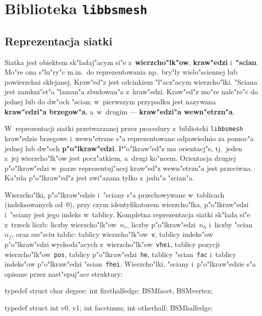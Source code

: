

\chapter{Biblioteka \texttt{libbsmesh}}

\section{Reprezentacja siatki}

Siatka jest obiektem sk"ladaj"acym si"e z~\textbf{wierzcho"lk"ow},
\textbf{kraw"edzi} i~\textbf{"scian}. Mo"re ona s"lu"ry"c m.in.\ do
reprezentowania np.\ bry"ly wielo"sciennej lub powierzchni sklejanej.
Kraw"ed"z jest odcinkiem "l"acz"acym wierzcho"lki.
"Sciana jest zamkni"et"a "laman"a zbudowan"a z~kraw"edzi. Kraw"ed"z mo"re
nale"re"c do jednej lub do dw"och "scian; w~pierwszym przypadku jest
nazywana \textbf{kraw"edzi"a brzegow"a}, a~w~drugim --- \textbf{kraw"edzi"a
wewn"etrzn"a}.

W~reprezentacji siatki przetwarzanej przez procedury z~biblioteki
\texttt{libbsmesh} kraw"edzie brzegowe i~wewn"etrzne s"a reprezentowane
odpowiednio za pomoc"a jednej lub dw"och \textbf{p"o"lkraw"edzi}.
P"o"lkraw"ed"z ma orientacj"e, tj.\ jeden z~jej wierzcho"lk"ow jest
pocz"atkiem, a~drugi ko"ncem. Orientacja drugiej p"o"lkraw"edzi w~parze
reprezentuj"acej kraw"ed"z wewn"etrzn"a jest przeciwna. Ka"rda
p"o"lkraw"ed"z jest zwi"azana tylko z~jedn"a "scian"a.

Wierzcho"lki, p"o"lkraw"edzie i~"sciany s"a przechowywane w~tablicach
(indeksowanych od~$0$), przy czym identyfikatorem wierzcho"lka,
p"o"lkraw"edzi i~"sciany jest jego indeks w~tablicy. Kompletna reprezentacja
siatki sk"lada si"e z~trzech liczb: liczby wierzcho"lk"ow~$n_v$, liczby
p"o"lkraw"edzi~$n_h$ i~liczby "scian~$n_f$, oraz sze"sciu tablic:
tablicy wierzcho"lk"ow~\texttt{v}, tablicy indeks"ow p"o"lkraw"edzi
wychodz"acych z~wierzcho"lk"ow~\texttt{vhei}, tablicy pozycji
wierzcho"lk"ow~\texttt{pos}, tablicy p"o"lkraw"edzi~\texttt{he}, tablicy
"scian~\texttt{fac} i~tablicy indeks"ow p"o"lkraw"edzi "scian~\texttt{fhei}.
Wierzcho"lki, "sciany i~p"o"lkraw"edzie s"a opisane przez nast"epuj"ace
struktury:

\vspace{\medskipamount}
\begin{listingC}
typedef struct {
    char degree;
    int  firsthalfedge;
  } BSMfacet, BSMvertex;

typedef struct {
    int v0, v1; 
    int facetnum;
    int otherhalf;
  } BSMhalfedge;  
\end{listingC}


